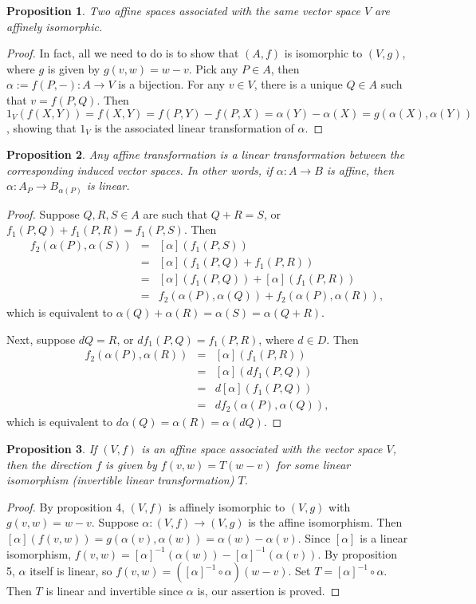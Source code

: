 \documentclass[12pt]{article}
\newtheorem{prop}{Proposition}
\begin{document}
\begin{prop} Two affine spaces associated with the same vector space $V$ are affinely isomorphic. \end{prop}
\begin{proof}
In fact, all we need to do is to show that $(A,f)$ is isomorphic to $(V,g)$, where $g$ is given by $g(v,w)=w-v$.  Pick any $P\in A$, then $\alpha:=f(P,-):A\to V$ is a bijection.  For any $v\in V$, there is a unique $Q\in A$ such that $v=f(P,Q)$.  Then $1_V(f(X,Y))=f(X,Y)=f(P,Y)-f(P,X)=\alpha(Y)-\alpha(X)=g(\alpha(X),\alpha(Y))$, showing that $1_V$ is the associated linear transformation of $\alpha$.
\end{proof}

\begin{prop} Any affine transformation is a linear transformation between the corresponding induced vector spaces.  In other words, if $\alpha: A \to B$ is affine, then $\alpha: A_P \to B_{\alpha(P)}$ is linear.  \end{prop}
\begin{proof}  Suppose $Q,R,S\in A$ are such that $Q+R=S$, or $f_1(P,Q)+f_1(P,R)=f_1(P,S)$.  Then 
\begin{eqnarray*}
f_2(\alpha(P),\alpha(S)) &=& [\alpha](f_1(P,S)) \\ 
&=& [\alpha](f_1(P,Q)+f_1(P,R)) \\ 
&=& [\alpha](f_1(P,Q))+[\alpha](f_1(P,R)) \\
&=& f_2(\alpha(P),\alpha(Q))+f_2(\alpha(P),\alpha(R)),
\end{eqnarray*} 
which is equivalent to $\alpha(Q) + \alpha(R) = \alpha(S)= \alpha(Q+R)$.

Next, suppose $dQ=R$, or $df_1(P,Q)=f_1(P,R)$, where $d\in D$.  Then 
\begin{eqnarray*}
f_2(\alpha(P),\alpha(R)) &=& [\alpha](f_1(P,R)) \\ 
&=& [\alpha](df_1(P,Q)) \\ 
&=& d[\alpha](f_1(P,Q)) \\
&=& df_2(\alpha(P),\alpha(Q)),
\end{eqnarray*} 
which is equivalent to $d\alpha(Q)=\alpha(R)=\alpha(dQ)$.
\end{proof}

\begin{prop} If $(V,f)$ is an affine space associated with the vector space $V$, then the direction $f$ is given by $f(v,w)=T(w-v)$ for some linear isomorphism (invertible linear transformation) $T$. \end{prop}
\begin{proof}  By proposition 4, $(V,f)$ is affinely isomorphic to $(V,g)$ with $g(v,w)=w-v$.  Suppose $\alpha:(V,f) \to (V,g)$ is the affine isomorphism.  Then $[\alpha](f(v,w))=g(\alpha(v),\alpha(w))=\alpha(w)-\alpha(v)$.  Since $[\alpha]$ is a linear isomorphism, $f(v,w)=[\alpha]^{-1}(\alpha(w))-[\alpha]^{-1}(\alpha(v))$.  By proposition 5, $\alpha$ itself is linear, so $f(v,w)=([\alpha]^{-1}\circ \alpha)(w-v)$.  Set $T=[\alpha]^{-1}\circ \alpha$.  Then $T$ is linear and invertible since $\alpha$ is, our assertion is proved.
\end{proof}
\end{document}
